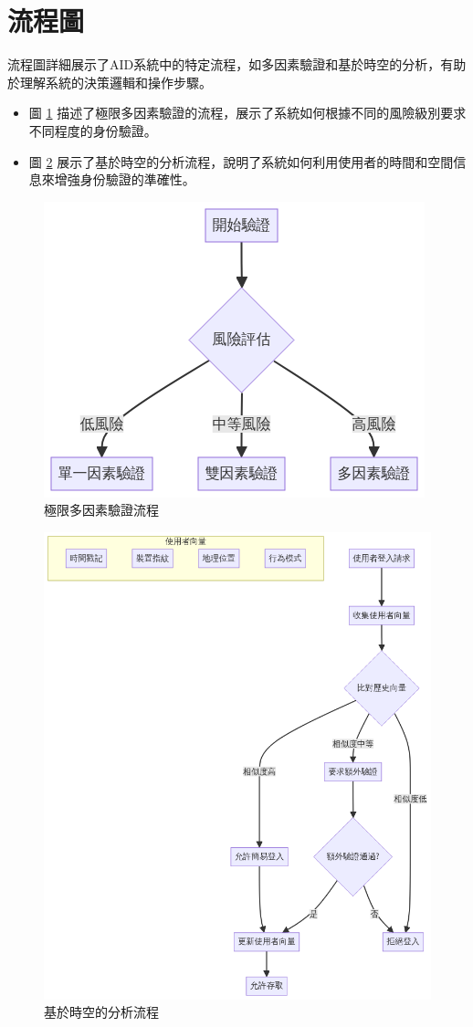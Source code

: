 \section{流程圖}
流程圖詳細展示了AID系統中的特定流程，如多因素驗證和基於時空的分析，有助於理解系統的決策邏輯和操作步驟。
\begin{itemize}
  \item 圖 \ref{fig:appendix-emfa} 描述了極限多因素驗證的流程，展示了系統如何根據不同的風險級別要求不同程度的身份驗證。
  \item 圖 \ref{fig:appendix-time-space-analysis} 展示了基於時空的分析流程，說明了系統如何利用使用者的時間和空間信息來增強身份驗證的準確性。
\end{itemize}
\begin{figure}[p]
  \centering
  \includegraphics[width=\linewidth]{figures/EMFA.png}
  \caption{極限多因素驗證流程}
  \label{fig:appendix-emfa}
\end{figure}
\clearpage
\begin{figure}[p]
  \centering
  \includegraphics[width=\linewidth]{figures/time-space-analysis-uml.png}
  \caption{基於時空的分析流程}
  \label{fig:appendix-time-space-analysis}
\end{figure}